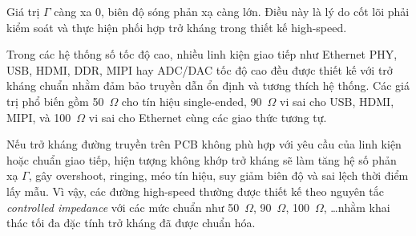                         Giá trị \(\Gamma\) càng xa 0, biên độ sóng phản xạ càng lớn. Điều này là lý do cốt lõi phải kiểm soát và thực hiện phối hợp trở kháng trong thiết kế high-speed.
                        

                        
                        Trong các hệ thống số tốc độ cao, nhiều linh kiện giao tiếp như Ethernet PHY, USB, HDMI, DDR, MIPI hay ADC/DAC tốc độ cao đều được thiết kế với trở kháng chuẩn nhằm đảm bảo truyền dẫn ổn định và tương thích hệ thống. Các giá trị phổ biến gồm 50~\(\Omega\) cho tín hiệu single-ended, 90~\(\Omega\) vi sai cho USB, HDMI, MIPI, và 100~\(\Omega\) vi sai cho Ethernet cùng các giao thức tương tự.

                        Nếu trở kháng đường truyền trên PCB không phù hợp với yêu cầu của linh kiện hoặc chuẩn giao tiếp, hiện tượng không khớp trở kháng sẽ làm tăng hệ số phản xạ \(\Gamma\), gây overshoot, ringing, méo tín hiệu, suy giảm biên độ và sai lệch thời điểm lấy mẫu. Vì vậy, các đường high-speed thường được thiết kế theo nguyên tắc \textit{controlled impedance} với các mức chuẩn như 50~\(\Omega\), 90~\(\Omega\), 100~\(\Omega\), \ldots nhằm khai thác tối đa đặc tính trở kháng đã được chuẩn hóa.
                    
